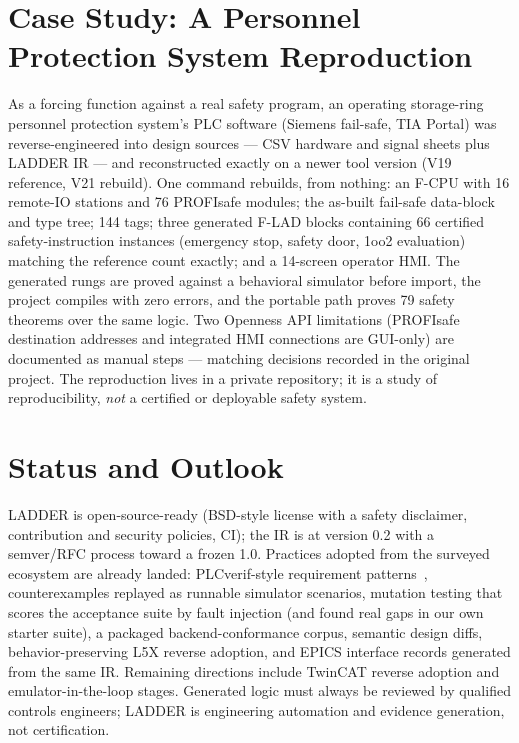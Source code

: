 \documentclass[letterpaper]{jacow}
\begin{document}
\section{Case Study: A Personnel Protection System Reproduction}

As a forcing function against a real safety program, an operating
storage-ring personnel protection system's PLC software (Siemens
fail-safe, TIA Portal) was reverse-engineered into design sources ---
CSV hardware and signal sheets plus LADDER IR --- and reconstructed
exactly on a newer tool version (V19 reference, V21 rebuild). One
command rebuilds, from nothing: an F-CPU with 16 remote-IO stations
and 76 PROFIsafe modules; the as-built fail-safe data-block and type
tree; 144 tags; three generated F-LAD blocks containing 66 certified
safety-instruction instances (emergency stop, safety door, 1oo2
evaluation) matching the reference count exactly; and a 14-screen
operator HMI. The generated rungs are proved against a behavioral
simulator before import, the project compiles with zero errors, and
the portable path proves 79 safety theorems over the same logic. Two
Openness API limitations (PROFIsafe destination addresses and
integrated HMI connections are GUI-only) are documented as manual
steps --- matching decisions recorded in the original project. The
reproduction lives in a private repository; it is a study of
reproducibility, \emph{not} a certified or deployable safety system.

\section{Status and Outlook}

LADDER is open-source-ready (BSD-style license with a safety
disclaimer, contribution and security policies, CI); the IR is at
version 0.2 with a semver/RFC process toward a frozen 1.0. Practices
adopted from the surveyed ecosystem are already landed: PLCverif-style
requirement patterns~\cite{plcverif-status}, counterexamples replayed
as runnable simulator scenarios, mutation testing that scores the
acceptance suite by fault injection (and found real gaps in our own
starter suite), a packaged backend-conformance corpus, semantic design
diffs, behavior-preserving L5X reverse adoption, and EPICS interface
records generated from the same IR. Remaining directions include
TwinCAT reverse adoption and emulator-in-the-loop stages. Generated
logic must always be reviewed by qualified controls engineers; LADDER
is engineering automation and evidence generation, not certification.
\end{document}
